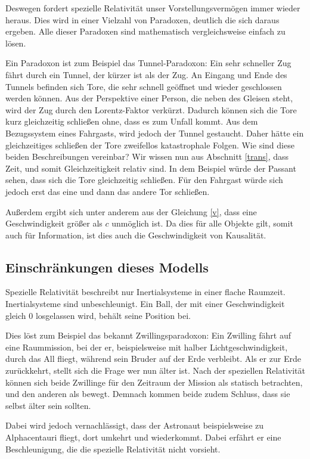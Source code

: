 \documentclass[12pt]{article}
\begin{document}
Deswegen fordert spezielle Relativität unser Vorstellungsvermögen immer wieder heraus.
Dies wird in einer Vielzahl von Paradoxen, deutlich die sich daraus ergeben.
Alle dieser Paradoxen sind mathematisch vergleichsweise einfach zu lösen.

Ein Paradoxon ist zum Beispiel das Tunnel-Paradoxon:
Ein sehr schneller Zug fährt durch ein Tunnel, der kürzer ist als der Zug.
An Eingang und Ende des Tunnels befinden sich Tore, die sehr schnell geöffnet und wieder geschlossen werden können.
Aus der Perspektive einer Person, die neben des Gleisen steht, wird der Zug durch den Lorentz-Faktor verkürzt.
Dadurch können sich die Tore kurz gleichzeitig schließen ohne, dass es zum Unfall kommt.
Aus dem Bezugssystem eines Fahrgasts, wird jedoch der Tunnel gestaucht.
Daher hätte ein gleichzeitiges schließen der Tore zweifellos katastrophale Folgen.
Wie sind diese beiden Beschreibungen vereinbar?
Wir wissen nun aus Abschnitt \ref{trans}, dass Zeit, und somit Gleichzeitigkeit relativ sind.
In dem Beispiel würde der Passant sehen, dass sich die Tore gleichzeitig schließen.
Für den Fahrgast würde sich jedoch erst das eine und dann das andere Tor schließen.

Außerdem ergibt sich unter anderem aus der Gleichung \ref{v}, dass eine Geschwindigkeit größer als $c$ unmöglich ist.
Da dies für alle Objekte gilt, somit auch für Information,  ist dies auch die Geschwindigkeit von Kausalität.
\subsection{Einschränkungen dieses Modells}
Spezielle Relativität beschreibt nur Inertialsysteme in einer flache Raumzeit.
Inertialsysteme sind unbeschleunigt.
Ein Ball, der mit einer Geschwindigkeit gleich 0 losgelassen wird, behält seine Position bei.

Dies löst zum Beispiel das bekannt Zwillingsparadoxon:
Ein Zwilling fährt auf eine Raummission, bei der er, beispielsweise mit halber Lichtgeschwindigkeit, durch das All fliegt, während sein Bruder auf der Erde verbleibt.
Als er zur Erde zurückkehrt, stellt sich die Frage wer nun älter ist.
Nach der speziellen Relativität können sich beide Zwillinge für den Zeitraum der Mission als statisch betrachten, und den anderen als bewegt.
Demnach kommen beide zudem Schluss, dass sie selbst älter sein sollten.

Dabei wird jedoch vernachlässigt, dass der Astronaut beispielsweise zu Alphacentauri fliegt, dort umkehrt und wiederkommt.
Dabei erfährt er eine Beschleunigung, die die spezielle Relativität nicht vorsieht.
\end{document}
